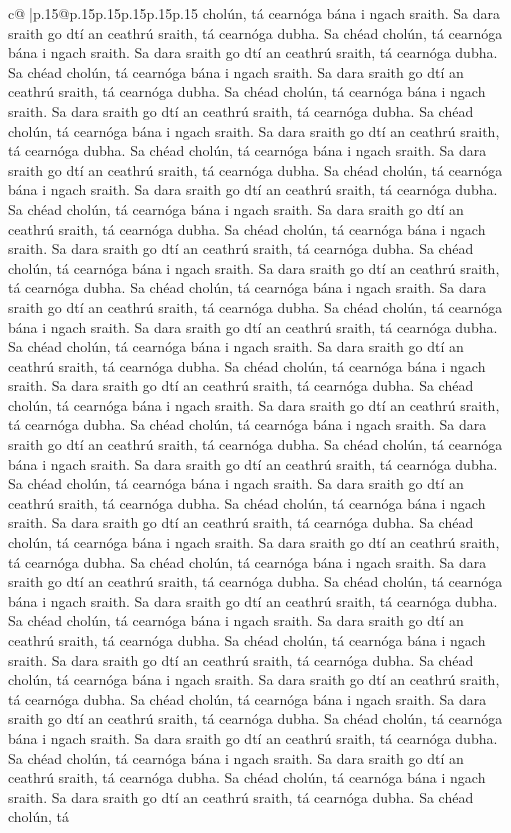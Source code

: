 \documentclass{article}
\begin{document}
{\begin{supertabular}{c@{$\;$}|p{.15\linewidth}@{}p{.15\linewidth}p{.15\linewidth}p{.15\linewidth}p{.15\linewidth}p{.15\linewidth}}
{{{cholún, tá cearnóga bána i ngach sraith. Sa dara sraith go dtí an ceathrú sraith, tá cearnóga dubha. Sa chéad cholún, tá cearnóga bána i ngach sraith. Sa dara sraith go dtí an ceathrú sraith, tá cearnóga dubha. Sa chéad cholún, tá cearnóga bána i ngach sraith. Sa dara sraith go dtí an ceathrú sraith, tá cearnóga dubha. Sa chéad cholún, tá cearnóga bána i ngach sraith. Sa dara sraith go dtí an ceathrú sraith, tá cearnóga dubha. Sa chéad cholún, tá cearnóga bána i ngach sraith. Sa dara sraith go dtí an ceathrú sraith, tá cearnóga dubha. Sa chéad cholún, tá cearnóga bána i ngach sraith. Sa dara sraith go dtí an ceathrú sraith, tá cearnóga dubha. Sa chéad cholún, tá cearnóga bána i ngach sraith. Sa dara sraith go dtí an ceathrú sraith, tá cearnóga dubha. Sa chéad cholún, tá cearnóga bána i ngach sraith. Sa dara sraith go dtí an ceathrú sraith, tá cearnóga dubha. Sa chéad cholún, tá cearnóga bána i ngach sraith. Sa dara sraith go dtí an ceathrú sraith, tá cearnóga dubha. Sa chéad cholún, tá cearnóga bána i ngach sraith. Sa dara sraith go dtí an ceathrú sraith, tá cearnóga dubha. Sa chéad cholún, tá cearnóga bána i ngach sraith. Sa dara sraith go dtí an ceathrú sraith, tá cearnóga dubha. Sa chéad cholún, tá cearnóga bána i ngach sraith. Sa dara sraith go dtí an ceathrú sraith, tá cearnóga dubha. Sa chéad cholún, tá cearnóga bána i ngach sraith. Sa dara sraith go dtí an ceathrú sraith, tá cearnóga dubha. Sa chéad cholún, tá cearnóga bána i ngach sraith. Sa dara sraith go dtí an ceathrú sraith, tá cearnóga dubha. Sa chéad cholún, tá cearnóga bána i ngach sraith. Sa dara sraith go dtí an ceathrú sraith, tá cearnóga dubha. Sa chéad cholún, tá cearnóga bána i ngach sraith. Sa dara sraith go dtí an ceathrú sraith, tá cearnóga dubha. Sa chéad cholún, tá cearnóga bána i ngach sraith. Sa dara sraith go dtí an ceathrú sraith, tá cearnóga dubha. Sa chéad cholún, tá cearnóga bána i ngach sraith. Sa dara sraith go dtí an ceathrú sraith, tá cearnóga dubha. Sa chéad cholún, tá cearnóga bána i ngach sraith. Sa dara sraith go dtí an ceathrú sraith, tá cearnóga dubha. Sa chéad cholún, tá cearnóga bána i ngach sraith. Sa dara sraith go dtí an ceathrú sraith, tá cearnóga dubha. Sa chéad cholún, tá cearnóga bána i ngach sraith. Sa dara sraith go dtí an ceathrú sraith, tá cearnóga dubha. Sa chéad cholún, tá cearnóga bána i ngach sraith. Sa dara sraith go dtí an ceathrú sraith, tá cearnóga dubha. Sa chéad cholún, tá cearnóga bána i ngach sraith. Sa dara sraith go dtí an ceathrú sraith, tá cearnóga dubha. Sa chéad cholún, tá cearnóga bána i ngach sraith. Sa dara sraith go dtí an ceathrú sraith, tá cearnóga dubha. Sa chéad cholún, tá cearnóga bána i ngach sraith. Sa dara sraith go dtí an ceathrú sraith, tá cearnóga dubha. Sa chéad cholún, tá cearnóga bána i ngach sraith. Sa dara sraith go dtí an ceathrú sraith, tá cearnóga dubha. Sa chéad cholún, tá cearnóga bána i ngach sraith. Sa dara sraith go dtí an ceathrú sraith, tá cearnóga dubha. Sa chéad cholún, tá cearnóga bána i ngach sraith. Sa dara sraith go dtí an ceathrú sraith, tá cearnóga dubha. Sa chéad cholún, tá cearnóga bána i ngach sraith. Sa dara sraith go dtí an ceathrú sraith, tá cearnóga dubha. Sa chéad cholún, tá }}}
\end{supertabular}}
\end{document}
